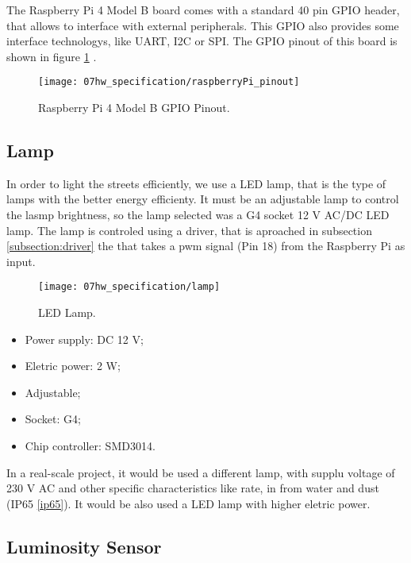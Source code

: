 The Raspberry Pi 4 Model B board comes with a standard 40 pin GPIO header, that allows to interface with external peripherals. This GPIO also provides some interface technologys, like UART, I2C or SPI. The GPIO pinout of this board is shown in figure \ref{fig:rasp_pinout} \cite{pinout}.

\begin{figure}[ht]
	\centering
	\texttt{[image: 07hw\_specification/raspberryPi\_pinout]}
	\caption{Raspberry Pi 4 Model B GPIO Pinout.}
	\label{fig:rasp_pinout}
\end{figure}

\subsection{Lamp}

In order to light the streets efficiently, we use a LED lamp, that is the type of lamps with the better energy efficienty. It must be an adjustable lamp to control the lasmp brightness, so the lamp selected was a G4 socket 12 V AC/DC LED lamp. The lamp is controled using a driver, that is aproached in subsection \ref{subsection:driver} the that takes a \ac{pwm} signal (Pin 18) from the Raspberry Pi as input. 

\begin{figure}[ht]
	\centering
	\texttt{[image: 07hw\_specification/lamp]}
	\caption{LED Lamp.}
	\label{fig:lamp}
\end{figure}


\begin{itemize}
	\item Power supply: DC 12 V;
	\item Eletric power: 2 W;
	\item Adjustable;
	\item Socket: G4;   
	\item Chip controller: SMD3014.
\end{itemize}

In a real-scale project, it would be used a different lamp, with supplu voltage of 230 V AC and other specific characteristics  like  rate, in  from water and dust (IP65 \ref{ip65}). It would be also used a LED lamp with higher eletric power. 

\subsection{Luminosity Sensor}

